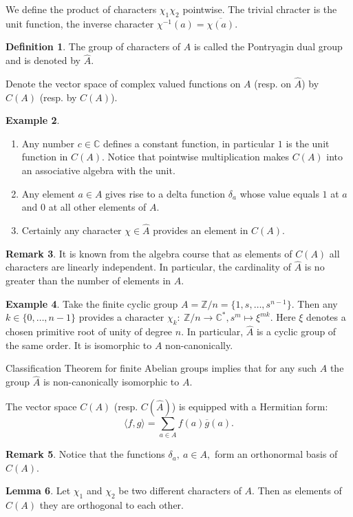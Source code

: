\documentclass[11pt]{amsart}
\theoremstyle{definition}
\newtheorem{defi}{Definition}[section]
\newtheorem{eg}[defi]{Example}
\newtheorem{rem}[defi]{Remark}
\newtheorem{lem}[defi]{Lemma}
\newcommand{\C}{\mathbb{C}}
\newcommand{\Z}{\mathbb{Z}}
\begin{document}
We define the product of characters $\chi_1\chi_2$ pointwise. The trivial chracter is the unit function, the inverse character $\chi^{-1}(a)=\overline{\chi(a)}$.  
\begin{defi}
    The group of characters of $A$ is called the Pontryagin dual group and is denoted by $\hat{A}$.
\end{defi}
Denote the vector space of complex valued functions on $A$ (resp. on $\hat{A}$) by $C(A)$
(resp. by $C(A)$).
\begin{eg}
\begin{enumerate}
    \item Any number $c\in\C$ defines a constant function, in particular $1$ is the unit function in $C(A)$. Notice that pointwise multiplication makes $C(A)$ into an associative algebra with the unit.
    \item Any element $a\in A$ gives rise to a delta function $\delta_a$ whose value equals $1$ at $a$ and $0$ at all other elements of $A$.
    \item Certainly any character $\chi\in \hat{A}$ provides an element in $C(A)$.
\end{enumerate}
\end{eg}
\begin{rem} It is known from the algebra course that as elements of $C(A)$ all characters are linearly independent. In particular, the cardinality of $\hat{A}$ is no greater than the number of elements in $A$.
\end{rem}
\begin{eg} Take the finite cyclic group $A=\Z/n=\{1,s,\ldots,s^{n-1}\}$. Then any $k\in\{0,\ldots,n-1\}$
 provides a character $\chi_k:\ \Z/n\to \C^*, s^m\mapsto \xi^{mk}$. Here $\xi$ denotes a chosen primitive root of unity of degree $n$. In particular, $\hat{A}$ is a cyclic group of the same order. It is isomorphic to $A$ non-canonically. 

 Classification Theorem for finite Abelian groups implies that for any such $A$ the group $\hat{A}$ is non-canonically isomorphic to $A$.
\end{eg}
The vector space $C(A)$ (resp. $C(\hat{A})$) is equipped with a Hermitian form: 
$$
\langle f,g\rangle=\sum_{a\in A}f(a)\overline g(a).$$
\begin{rem}
    Notice that the functions $\delta_a, \ a\in A,$ form an orthonormal basis of $C(A)$.
\end{rem}
\begin{lem} Let $\chi_1$ and $\chi_2$ be two different characters of $A$. Then as elements of $C(A)$ they are orthogonal to each other. 
\end{lem}
\end{document}
